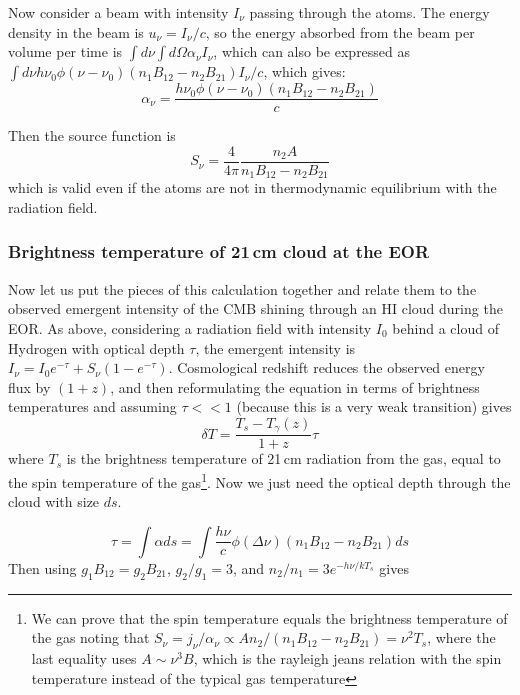 Now consider a beam with intensity $I_\nu$ passing through the atoms. The energy density in the beam is $u_\nu=I_\nu/c$, so the energy absorbed from the beam per volume per time is $\int d\nu\int d\Omega\alpha_\nu I_\nu$, which can also be expressed as $\int d\nu h\nu_0\phi(\nu-\nu_0)(n_1B_{12}-n_2B_{21})I_\nu/c$, which gives:
\begin{equation}
\boxed{\alpha_\nu=\frac{h\nu_0\phi(\nu-\nu_0)(n_1B_{12}-n_2B_{21})}{c}}
\end{equation}

Then the source function is
\begin{equation}
\boxed{S_\nu=\frac{4}{4\pi}\frac{ n_2A}{n_1B_{12}-n_2B_{21}}}
\end{equation}
which is valid even if the atoms are not in thermodynamic equilibrium with the radiation field. 

\subsubsection{Brightness temperature of 21\,cm cloud at the EOR}

Now let us put the pieces of this calculation together and relate them to the observed emergent intensity of the CMB shining through an HI cloud during the EOR. As above, considering a radiation field with intensity $I_0$ behind a cloud of Hydrogen with optical depth $\tau$, the emergent intensity is $I_\nu=I_0e^{-\tau}+S_\nu(1-e^{-\tau})$. Cosmological redshift reduces the observed energy flux by $(1+z)$, and then reformulating the equation in terms of brightness temperatures and assuming $\tau<<1$ (because this is a very weak transition) gives
\begin{equation}
\delta T=\frac{T_s-T_\gamma(z)}{1+z}\tau 
\end{equation}
where $T_s$ is the brightness temperature of 21\,cm radiation from the gas, equal to the spin temperature of the gas\footnote{We can prove that the spin temperature equals the brightness temperature of the gas noting that $S_\nu=j_\nu/\alpha_\nu\propto A n_2/(n_1B_{12}-n_2B_{21})=\nu^2 T_s$, where the last equality uses $A\sim\nu^3B$, which is the rayleigh jeans relation with the spin temperature instead of the typical gas temperature}. Now we just need the optical depth through the cloud with size $ds$.

\begin{equation}
\tau=\int\alpha ds=\int\frac{h\nu}{c}\phi(\Delta\nu)(n_1B_{12}-n_2B_{21})ds
\end{equation}
Then using $g_1B_{12}=g_2B_{21}$, $g_2/g_1=3$, and $n_2/n_1=3e^{-h\nu/kT_s}$ gives

